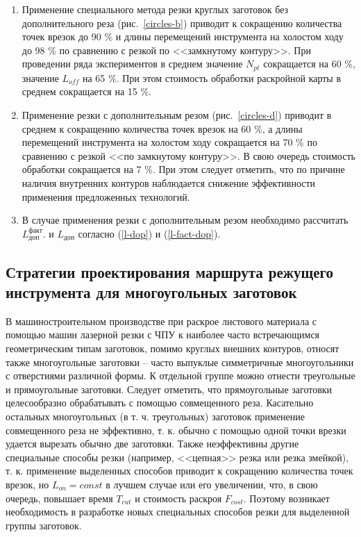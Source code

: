 \documentclass[11pt,twoside,openany]{report}
\begin{document}
\begin{enumerate}
\item
Применение специального метода резки круглых заготовок
без дополнительного реза
(рис.~\ref{circles-b})
приводит к сокращению количества точек врезок до 90 \%
и длины перемещений инструмента на холостом ходу до 98 \%
по сравнению с резкой по <<замкнутому контуру>>.
При проведении ряда экспериментов в среднем значение $N_{pt}$
сокращается на 60 \%, значение $L_{off}$ на 65 \%.
При этом стоимость обработки раскройной карты в среднем сокращается на 15 \%.

\item
Применение резки с дополнительным резом
(рис.~\ref{circles-d})
приводит в среднем к сокращению количества точек врезок на 60 \%,
а длины перемещений инструмента на холостом ходу сокращается на 70 \%
по сравнению с резкой <<по замкнутому контуру>>.
В свою очередь стоимость обработки сокращается на 7 \%.
При этом следует отметить,
что по причине наличия внутренних контуров
наблюдается снижение эффективности применения
предложенных технологий.

\item
В случае применения резки с дополнительным резом необходимо рассчитать
$L_\text{доп}^\text{факт}$.
и
$L_\text{доп}$
согласно (\ref{l-dop}) и (\ref{l-fact-dop}).
\end{enumerate}

{\raggedright\subsection{
  Стратегии проектирования маршрута режущего инструмента
  для многоугольных заготовок
}}

В машиностроительном производстве
при раскрое листового материала с помощью машин лазерной резки с ЧПУ
к наиболее часто встречающимся геометрическим
типам заготовок,
помимо круглых внешних контуров,
относят также многоугольные заготовки --
часто выпуклые симметричные многоугольники с отверстиями различной формы.
К отдельной группе можно отнести треугольные и прямоугольные заготовки.
Следует отметить, что прямоугольные заготовки целесообразно обрабатывать
с помощью совмещенного реза.
Касательно остальных многоугольных (в т. ч. треугольных)
заготовок применение совмещенного реза не эффективно,
т. к. обычно с помощью одной точки врезки удается вырезать обычно две заготовки.
Также неэффективны другие специальные способы резки
(например, <<цепная>> резка или резка змейкой),
т. к. применение выделенных способов приводит к
сокращению количества точек врезок,
но
$L_{on}=const$
в лучшем случае или его увеличении,
что,
в свою очередь,
повышает время
$T_{cut}$
и стоимость раскроя
$F_{cost}$.
Поэтому возникает необходимость в разработке
новых специальных способов резки для выделенной группы заготовок.
\end{document}
